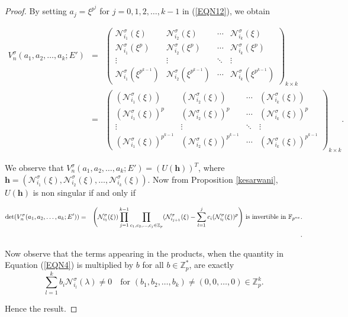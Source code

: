 \documentclass[11pt]{article}
\begin{document}
\begin{proof}
	By setting $a_j = \xi^{p^j}$ for $j = 0,1,2,\dots,k-1$ in (\ref{EQN12}), we obtain

	\begin{eqnarray*}
			V^\sigma_n(a_1,a_2,\dots,a_k;E') &=& 
		\begin{pmatrix}
			\mathcal{N}^\sigma_{i_1}(\xi) & \mathcal{N}^\sigma_{i_2}(\xi)& \cdots & \mathcal{N}^\sigma_{i_k}(\xi) \\
			\mathcal{N}^\sigma_{i_1}(\xi^{p}) & \mathcal{N}^\sigma_{i_2}(\xi^{p})&\cdots & \mathcal{N}^\sigma_{i_k}(\xi^{p}) \\
			\vdots &\vdots& \ddots & \vdots \\
			\mathcal{N}^\sigma_{i_1}(\xi^{p^{k-1}}) &\mathcal{N}^\sigma_{i_2}(\xi^{p^{k-1}})& \cdots & \mathcal{N}^\sigma_{i_k}(\xi^{p^{k-1}})
		\end{pmatrix}_{k \times k}\\
		&=&	\begin{pmatrix}
			(\mathcal{N}^\sigma_{i_1}(\xi)) & 	(\mathcal{N}^\sigma_{i_2}(\xi))& \cdots & 	(\mathcal{N}^\sigma_{i_k}(\xi)) \\
				(\mathcal{N}^\sigma_{i_1}(\xi))^{p} & (\mathcal{N}^\sigma_{i_2}(\xi))^{p}&\cdots & (\mathcal{N}^\sigma_{i_k}(\xi))^{p} \\
			\vdots &\vdots& \ddots & \vdots \\
			(\mathcal{N}^\sigma_{i_1}(\xi))^{p^{k-1}} &(\mathcal{N}^\sigma_{i_2}(\xi))^{p^{k-1}}& \cdots & (\mathcal{N}^\sigma_{i_k}(\xi))^{p^{k-1}}
		\end{pmatrix}_{k \times k}.
	\end{eqnarray*}
    
We observe that $V^\sigma_n(a_1,a_2,\dots,a_k;E')=(U(\textbf{h}))^{T}$, where $\textbf{h}=(\mathcal{N}^\sigma_{i_1}(\xi), \mathcal{N}^\sigma_{i_2}(\xi),\dots,\mathcal{N}^\sigma_{i_k}(\xi)).$ Now from Proposition \ref{kesarwani}, $U(\textbf{h})$ is non singular if and only if 


	\begin{eqnarray}\label{EQN4}
		\det(	V^\sigma_n(a_1,a_2,\dots,a_k;E'))\notag&=&\Bigg(\mathcal{N}^\sigma_{i_1}(\xi))\prod_{j=1}^{k-1}\prod_{c_1,c_2,\dots,c_j\in \mathbb{Z}_p}(\mathcal{N}^\sigma_{i_{j+1}}(\xi)-\sum_{l=1}^{j}c_i(\mathcal{N}^\sigma_{i_l}(\xi))^p\Bigg) \textup{ is invertible in } \mathbb{F}_{p^{ne}}.\\
		&~&.
	\end{eqnarray}
    
 Now observe that the terms appearing in the products, when the quantity in Equation (\ref{EQN4}) is 
multiplied by $b$ for all $b \in \mathbb{Z}_p^{\ast}$, are exactly
\[
\sum_{l=1}^{k} b_i \mathcal{N}^\sigma_{i_l}(\lambda) \neq 0 \quad 
\text{for } (b_1, b_2, \ldots, b_k) \neq (0,0,\ldots,0) \in \mathbb{Z}_p^{k}.
\]

Hence the result.
 
\end{proof}
\end{document}
